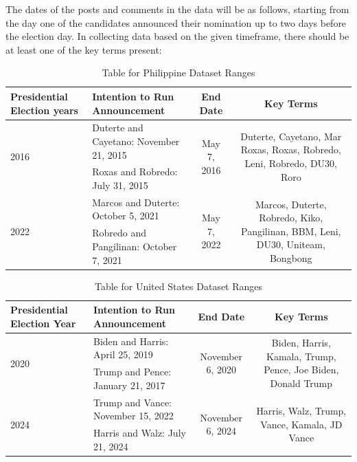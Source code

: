The dates of the posts and comments in the data will be as follows, starting from the day one of the candidates announced their nomination up to two days before the election day. In collecting data based on the given timeframe, there should be at least one of the key terms present:
\newline

\begin{table}[h]
    \centering
    \begin{tabularx}{\textwidth}{X|X|c|c}
        \textbf{Presidential Election years} & \textbf{Intention to Run Announcement} & \textbf{End Date} & \textbf{Key Terms}\\
        \hline\hline
        \multirow{2}{*}{2016} & Duterte and Cayetano: November 21, 2015 & \multirow{2}{*}{May 7, 2016} & \multirow{2}{4cm}{Duterte, Cayetano, Mar Roxas, Roxas, Robredo, Leni, Robredo, DU30, Roro} \\
        & Roxas and Robredo: July 31, 2015 & & \\ 
        \hline
        \multirow{2}{*}{2022}& Marcos and Duterte: October 5, 2021 & \multirow{2}{*}{May 7, 2022} & \multirow{2}{4cm}{Marcos, Duterte, Robredo, Kiko, Pangilinan, BBM, Leni, DU30, Uniteam, Bongbong} \\
        & Robredo and Pangilinan: October 7, 2021 & & \\
    \end{tabularx}
    \caption{Table for Philippine Dataset Ranges}
\end{table}
\begin{table}[h]
    \centering
    \begin{tabularx}{\textwidth}{X|X|c|c}
        \textbf{Presidential Election Year} & \textbf{Intention to Run Announcement} & \textbf{End Date} & \textbf{Key Terms}\\
        \hline\hline
        \multirow{2}{*}{2020} & Biden and Harris: April 25, 2019 & \multirow{2}{*}{November 6, 2020} & \multirow{2}{4cm}{Biden, Harris, Kamala, Trump, Pence, Joe Biden, Donald Trump} \\
        & Trump and Pence: January 21, 2017 & & \\ 
        \hline
        \multirow{2}{*}{2024}& Trump and Vance: November 15, 2022 & \multirow{2}{*}{November 6, 2024} & \multirow{2}{4cm}{Harris, Walz, Trump, Vance, Kamala, JD Vance} \\
        & Harris and Walz: July 21, 2024 & & \\
    \end{tabularx}
    \caption{Table for United States Dataset Ranges}
\end{table}


